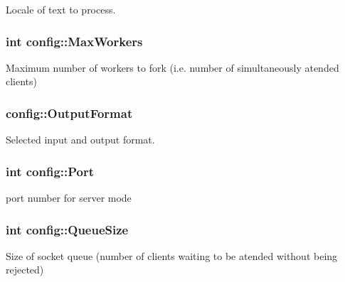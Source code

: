 Locale of text to process. 

\hypertarget{classconfig_a8771443c351f1d07be7eccc02beb8fff}{}
\subsubsection[{Max\+Workers}]{\setlength{\rightskip}{0pt plus 5cm}int config\+::\+Max\+Workers}\label{classconfig_a8771443c351f1d07be7eccc02beb8fff}


Maximum number of workers to fork (i.\+e. number of simultaneously atended clients) 

\hypertarget{classconfig_a79e21d6098e5fd1bfe615e2fef84a99f}{}
\subsubsection[{Output\+Format}]{ config\+::\+Output\+Format}\label{classconfig_a79e21d6098e5fd1bfe615e2fef84a99f}


Selected input and output format. 

\hypertarget{classconfig_a05e9c81408b74459038340658bcd3a20}{}
\subsubsection[{Port}]{\setlength{\rightskip}{0pt plus 5cm}int config\+::\+Port}\label{classconfig_a05e9c81408b74459038340658bcd3a20}


port number for server mode 

\hypertarget{classconfig_ab690d59ef9d289198d2676ddc6bd5772}{}
\subsubsection[{Queue\+Size}]{\setlength{\rightskip}{0pt plus 5cm}int config\+::\+Queue\+Size}\label{classconfig_ab690d59ef9d289198d2676ddc6bd5772}


Size of socket queue (number of clients waiting to be atended without being rejected) 

\hypertarget{classconfig_a8868de72bdafb627b21b7f20e16ebf9e}{}
